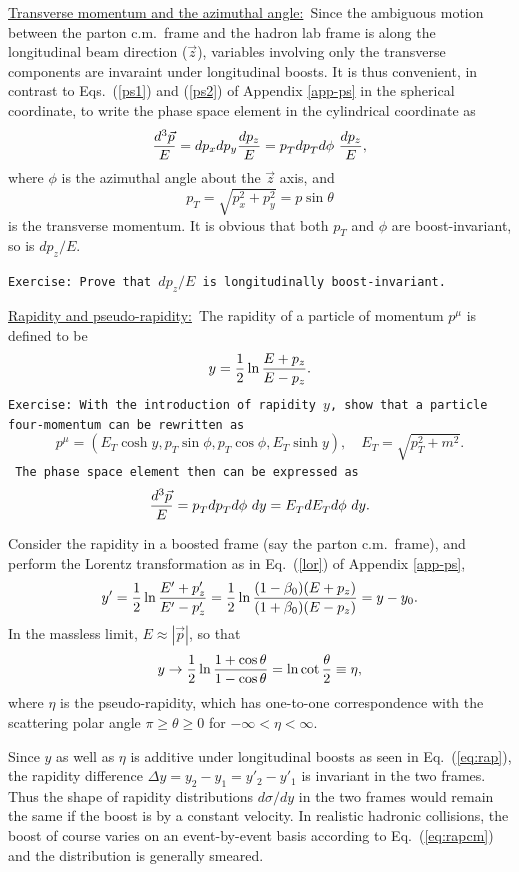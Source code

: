 \documentclass[12pt,prd,aps,floats,preprintnumbers,preprint,superscriptaddress,floatfix,nofootinbib]{revtex4}
\def\vp{{\vec p}}
\def\pt{p_T^{}}
\def\et{E_T^{}}
\def\be{\begin{equation}}
\def\ee{\end{equation}}
\begin{document}
\vskip 0.2cm
\noindent
\underline{Transverse momentum and the azimuthal angle:}\  Since the 
ambiguous motion between the parton c.m.~frame and the 
hadron lab frame is along
the longitudinal beam direction ($\vec z$), variables involving only
the transverse components are invaraint under longitudinal  boosts. It is thus
convenient, in contrast to Eqs.~(\ref{ps1})  and (\ref{ps2}) of Appendix \ref{app-ps} 
in the spherical coordinate,
 to write the phase space element in the cylindrical coordinate as
\be
{d^3\vec p\over E} = d p_x d p_y {d p_z\over E}  =  \pt d\pt d\phi\  {d p_z\over E} ,
\ee
where $\phi$ is the azimuthal angle about the $\vec z$ axis, and 
\be
\pt = \sqrt{p_x^2 + p_y^2} = p \sin\theta
\ee
 is the transverse momentum. It is obvious
that both $\pt$ and $\phi$ are  boost-invariant, so is $dp_z/E$.

\noindent
{\tt Exercise: Prove that $dp_z/E$ is longitudinally boost-invariant.}


\vskip 0.2cm
\noindent
\underline{Rapidity and pseudo-rapidity:}\  The rapidity of  a particle of momentum
$p^\mu$ is defined to be
\be
y = {1\over 2} \ln{E+p_z \over E - p_z }.
\ee
{\tt Exercise: With the introduction of  rapidity $y$, show that a particle 
four-momentum can be rewritten as 
\be
p^\mu=(E_T \cosh y, \pt \sin\phi, \pt \cos \phi, E_T\sinh y),\quad \et=\sqrt{p_T^2+m^2} .
\ee
The phase space element then can be expressed as
\be
{d^3\vec p\over E}  =  \pt d\pt d\phi\  dy =  \et d\et d\phi\  dy.
\ee  }

Consider the rapidity in a boosted frame (say the parton c.m.~frame), and
perform the Lorentz transformation as in Eq.~(\ref{lor}) of 
Appendix \ref{app-ps},
\be
y' = {1\over 2} \ln{E'+p'_z \over E' - p'_z } = 
{1\over 2}\ln{(1-\beta_0) (E+p_z) \over (1+\beta_0)(E - p_z) } = y - y_0.
\label{eq:rap}
\ee
In the massless limit, $E\approx |\vp|$, so that 
\be
y \to  {1\over 2} \ln{1+\cos\theta \over 1 - \cos\theta }= \ln{\cot {\theta \over 2} } \equiv \eta ,
\ee
where $\eta$ is the pseudo-rapidity, which has one-to-one correspondence with
the scattering polar angle $\pi \ge \theta\ge 0$ for $-\infty < \eta < \infty$. 

Since $y$ as well as $\eta$ is additive under longitudinal boosts as seen in 
Eq.~(\ref{eq:rap}), the rapidity difference 
$\Delta y= y_2 - y_1 = y'_2 - y'_1$ is invariant in the two frames. Thus the shape 
of  rapidity distributions $d\sigma/dy$ 
in the two frames would remain the same
if the boost is by a constant velocity. In realistic hadronic collisions, the boost
 of course varies on an event-by-event basis according to Eq.~(\ref{eq:rapcm})
 and the distribution is generally  smeared.
\end{document}
